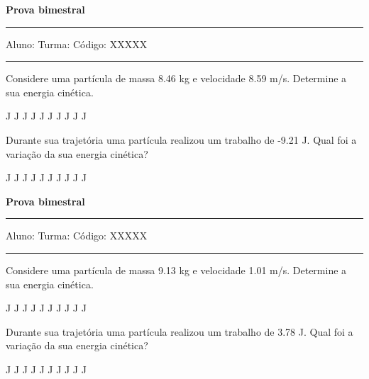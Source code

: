 \documentclass[addpoints]{exam}
\begin{document}
        
\begin{center}
	{\bf \Huge Prova bimestral}
	\vspace{1cm} \hrule \vspace{0.5cm}
	Aluno: \hfill Turma: \hfill Código: XXXXX
	\vspace{0.5cm} \hrule \vspace{0.5cm}
\end{center}

        \begin{questions}
\question[25] Considere uma partícula de massa    8.46 kg e velocidade    8.59 m/s. Determine a sua energia cinética.
\linebreak\linebreak

\begin{oneparchoices}
 J J J J J J J J J J\end{oneparchoices}
\question[25] Durante sua trajetória uma partícula realizou um trabalho de   -9.21 J. Qual foi a variação da sua energia cinética?
\linebreak\linebreak

\begin{oneparchoices}
 J J J J J J J J J J\end{oneparchoices}
\end{questions}
\newpage
\begin{center}
	{\bf \Huge Prova bimestral}
	\vspace{1cm} \hrule \vspace{0.5cm}
	Aluno: \hfill Turma: \hfill Código: XXXXX
	\vspace{0.5cm} \hrule \vspace{0.5cm}
\end{center}

        \begin{questions}
\question[25] Considere uma partícula de massa    9.13 kg e velocidade    1.01 m/s. Determine a sua energia cinética.
\linebreak\linebreak

\begin{oneparchoices}
 J J J J J J J J J J\end{oneparchoices}
\question[25] Durante sua trajetória uma partícula realizou um trabalho de    3.78 J. Qual foi a variação da sua energia cinética?
\linebreak\linebreak

\begin{oneparchoices}
 J J J J J J J J J J\end{oneparchoices}
\end{questions}
\newpage
\end{document}
